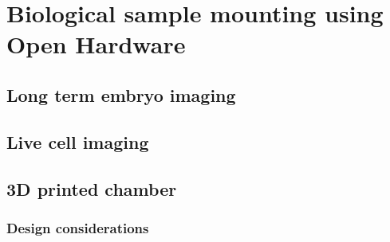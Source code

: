 \ifpdf
    \graphicspath{{Chapter/chamber/Figs/Raster/}{Chapter/chamber/Figs/PDF/}{Chapter6/Figs/}}
\else
    \graphicspath{{Chapter/chamber/Figs/Vector/}{Chapter/chamber/Figs/}}
\fi

\chapter{Biological sample mounting using Open Hardware}
\section{Long term embryo imaging}
\section{Live cell imaging}
\section{3D printed chamber}
\subsection{Design considerations}
